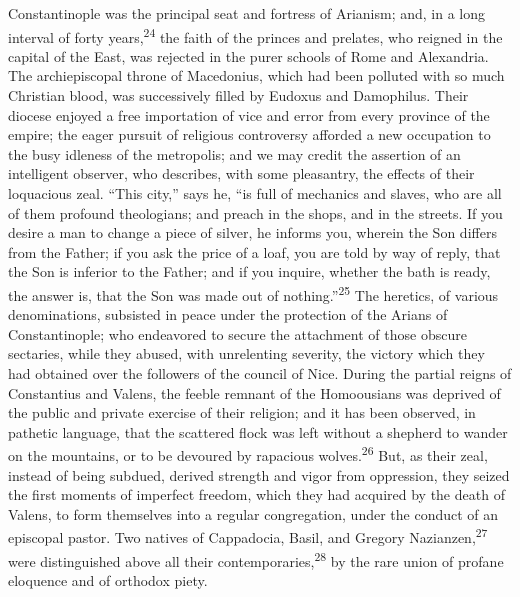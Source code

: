 Constantinople was the principal seat and fortress of Arianism;
and, in a long interval of forty years,\textsuperscript{24} the faith of the
princes and prelates, who reigned in the capital of the East, was
rejected in the purer schools of Rome and Alexandria. The
archiepiscopal throne of Macedonius, which had been polluted with
so much Christian blood, was successively filled by Eudoxus and
Damophilus. Their diocese enjoyed a free importation of vice and
error from every province of the empire; the eager pursuit of
religious controversy afforded a new occupation to the busy
idleness of the metropolis; and we may credit the assertion of an
intelligent observer, who describes, with some pleasantry, the
effects of their loquacious zeal. “This city,” says he, “is full
of mechanics and slaves, who are all of them profound
theologians; and preach in the shops, and in the streets. If you
desire a man to change a piece of silver, he informs you, wherein
the Son differs from the Father; if you ask the price of a loaf,
you are told by way of reply, that the Son is inferior to the
Father; and if you inquire, whether the bath is ready, the answer
is, that the Son was made out of nothing.”\textsuperscript{25} The heretics, of
various denominations, subsisted in peace under the protection of
the Arians of Constantinople; who endeavored to secure the
attachment of those obscure sectaries, while they abused, with
unrelenting severity, the victory which they had obtained over
the followers of the council of Nice. During the partial reigns
of Constantius and Valens, the feeble remnant of the Homoousians
was deprived of the public and private exercise of their
religion; and it has been observed, in pathetic language, that
the scattered flock was left without a shepherd to wander on the
mountains, or to be devoured by rapacious wolves.\textsuperscript{26} But, as
their zeal, instead of being subdued, derived strength and vigor
from oppression, they seized the first moments of imperfect
freedom, which they had acquired by the death of Valens, to form
themselves into a regular congregation, under the conduct of an
episcopal pastor. Two natives of Cappadocia, Basil, and Gregory
Nazianzen,\textsuperscript{27} were distinguished above all their contemporaries,\textsuperscript{28}
by the rare union of profane eloquence and of orthodox piety.

